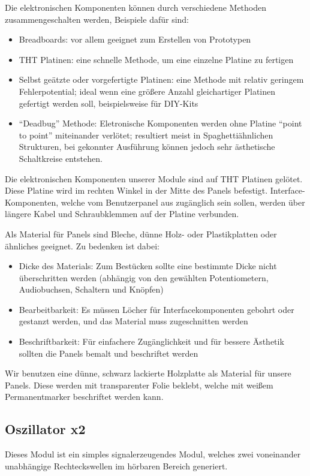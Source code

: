 Die elektronischen Komponenten können durch verschiedene Methoden zusammengeschalten werden, Beispiele dafür sind:
\begin{itemize}
\item Breadboards:
vor allem geeignet zum Erstellen von Prototypen
\item \ac{THT} Platinen:
eine schnelle Methode, um eine einzelne Platine zu fertigen
\item Selbst geätzte oder vorgefertigte Platinen:
eine Methode mit relativ geringem Fehlerpotential; ideal wenn eine größere Anzahl gleichartiger Platinen gefertigt werden soll, beispielsweise für DIY-Kits
\item "`Deadbug"' Methode:
Eletronische Komponenten werden ohne Platine "`point to point"' miteinander verlötet; resultiert meist in Spaghettiähnlichen Strukturen, bei gekonnter Ausführung können jedoch sehr ästhetische Schaltkreise entstehen.
\end{itemize}

Die elektronischen Komponenten unserer Module sind auf \ac{THT} Platinen gelötet. Diese Platine wird im rechten Winkel in der Mitte des Panels befestigt. Interface-Komponenten, welche vom Benutzerpanel aus zugänglich sein sollen, werden über längere Kabel und Schraubklemmen auf der Platine verbunden.

Als Material für Panels sind Bleche, dünne Holz- oder Plastikplatten oder ähnliches geeignet. Zu bedenken ist dabei:

\begin{itemize}
\item Dicke des Materials:
Zum Bestücken sollte eine bestimmte Dicke nicht überschritten werden (abhängig von den gewählten Potentiometern, Audiobuchsen, Schaltern und Knöpfen)
\item Bearbeitbarkeit:
Es müssen Löcher für Interfacekomponenten gebohrt oder gestanzt werden, und das Material muss zugeschnitten werden
\item Beschriftbarkeit:
Für einfachere Zugänglichkeit und für bessere Ästhetik sollten die Panels bemalt und beschriftet werden
\end{itemize}

Wir benutzen eine dünne, schwarz lackierte Holzplatte als Material für unsere Panels. Diese werden mit transparenter Folie beklebt, welche mit weißem Permanentmarker beschriftet werden kann.
\subsection{Oszillator x2 \label{Osci}}
\label{sec:org91cc1af}
Dieses Modul ist ein simples signalerzeugendes Modul, welches zwei voneinander unabhängige Rechteckswellen im hörbaren Bereich generiert.

